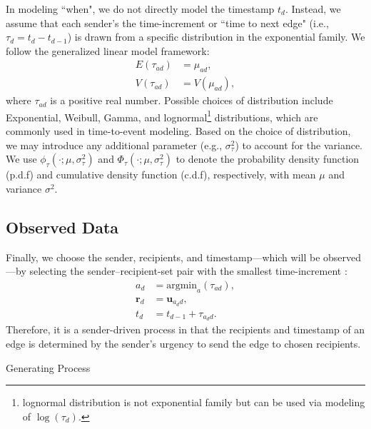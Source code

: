 \documentclass[12pt]{article}
\begin{document}
In modeling ``when", we do not directly model the timestamp $t_d$. Instead, we assume that each sender's the time-increment or ``time to next edge" (i.e., $\tau_{d} = t_d-t_{d-1}$) is drawn from a specific distribution in the exponential family.  We follow the generalized linear model framework:
\begin{equation}
\begin{aligned}
E(\tau_{ad}) &= \mu_{ad},\\
V(\tau_{ad}) &= V(\mu_{ad}),
\end{aligned}
\end{equation}
where $\tau_{ad}$ is a positive real number. Possible choices of distribution include Exponential, Weibull, Gamma, and lognormal\footnote{lognormal distribution is not exponential family but can be used via modeling of $\log(\tau_d)$.} distributions, which are commonly used in time-to-event modeling. Based on the choice of distribution, we may introduce any additional parameter (e.g., $\sigma_\tau^2$) to account for the variance. We use $\phi_\tau(\cdot; \mu, \sigma_\tau^2)$ and $\Phi_\tau(\cdot; \mu, \sigma_\tau^2)$ to denote the probability density function (p.d.f) and cumulative density function (c.d.f), respectively, with mean $\mu$ and variance $\sigma^2$.

\subsection{Observed Data}\label{subsec:Observed}
Finally, we choose the sender, recipients, and timestamp---which will be observed---by selecting the sender--recipient-set pair with the smallest time-increment \cite{snijders1996stochastic}:
\begin{equation}
\begin{aligned}
a_d &= \mbox{argmin}_{a}(\tau_{ad}),\\
\boldsymbol{r}_d &= \boldsymbol{u}_{a_d d},\\
t_d &=t_{d-1} + \tau_{a_d d}.
\end{aligned}
\end{equation}
Therefore, it is a sender-driven process in that the recipients and timestamp of an edge is determined by the sender's urgency to send the edge to chosen recipients. 
	\begin{algorithm}[H]
		\SetAlgoLined
		\caption{Generating Process}
			\label{alg:generative}
		\end{algorithm}
\end{document}
